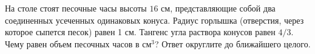 
На столе стоят песочные часы высоты $16$ см, представляющие собой два соединенных усеченных одинаковых конуса. 
Радиус горлышка (отверстия, через которое сыпется песок) равен 1 см. 
Тангенс угла раствора конусов равен $4/3$. Чему равен объем песочных часов в см$^3$? 
Ответ округлите до ближайшего целого.

\soultionSection

